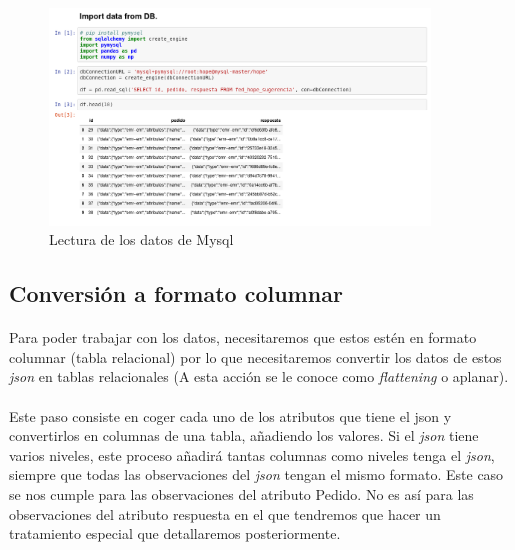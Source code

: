 \documentclass[10pt,a4paper,oneside]{book}
\begin{document}
\paragraph{}
\begin{figure}[!htb]
  \centering
  \includegraphics[width=0.9\textwidth]{images/metodologia-extract-data-mysql.png}
  \caption{Lectura de los datos de Mysql}
\end{figure}

\newpage
\subsection{Conversión a formato columnar}

\paragraph{}
Para poder trabajar con los datos, necesitaremos que estos estén en formato columnar (tabla relacional) por lo que necesitaremos convertir los datos de estos \textit{json} en tablas relacionales (A esta acción se le conoce como \textit{flattening} o aplanar). 

\paragraph{}
Este paso consiste en coger cada uno de los atributos que tiene el json y convertirlos en columnas de una tabla, añadiendo los valores. Si el \textit{json} tiene varios niveles, este proceso añadirá tantas columnas como niveles tenga el \textit{json}, siempre que todas las observaciones del \textit{json} tengan el mismo formato. Este caso se nos cumple para las observaciones del atributo Pedido. No es así para las observaciones del atributo respuesta en el que tendremos que hacer un tratamiento especial que detallaremos posteriormente.
\end{document}
